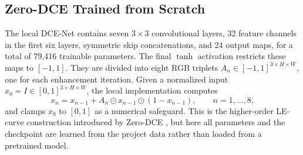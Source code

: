 \documentclass[11pt,a4paper]{article}
\begin{document}
\subsection{Zero-DCE Trained from Scratch}
\label{sec:scratch-zerodce}

The local DCE-Net contains seven \(3\times3\) convolutional layers, 32 feature
channels in the first six layers, symmetric skip concatenations, and 24 output
maps, for a total of 79,416 trainable parameters. The final \(\tanh\) activation
restricts these maps to \([-1,1]\). They are divided into eight RGB triplets
\(A_n\in[-1,1]^{3\times H\times W}\), one for each enhancement iteration.
Given a normalized input \(x_0=I\in[0,1]^{3\times H\times W}\), the local
implementation computes
\begin{equation}
 x_n=x_{n-1}+A_n\odot x_{n-1}\odot(1-x_{n-1}),
 \qquad n=1,\ldots,8,
\end{equation}
and clamps \(x_8\) to \([0,1]\) as a numerical safeguard. This is the
higher-order LE-curve construction introduced by Zero-DCE
\cite{guo2020zerodce}, but here all parameters and the checkpoint are learned
from the project data rather than loaded from a pretrained model.
\end{document}
